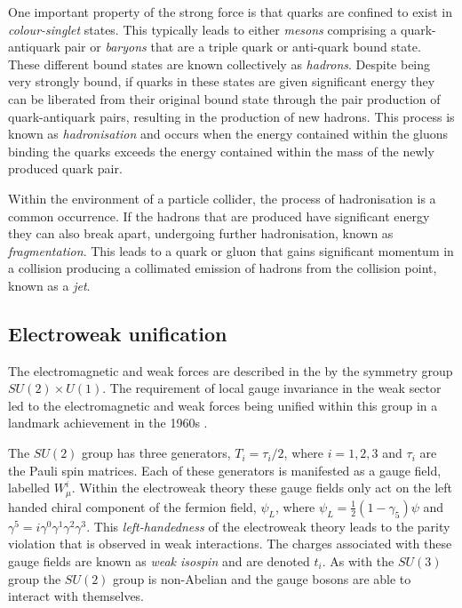 One important property of the strong force is that quarks are
confined to exist in \emph{colour-singlet} states. This typically leads to either
\emph{mesons} comprising a quark-antiquark pair or \emph{baryons} that are a
triple quark or anti-quark bound state. These different bound states are known
collectively as \emph{hadrons}. Despite being very strongly bound, if
quarks in these states are given significant energy they can be
liberated from their original bound state through the pair production
of quark-antiquark pairs, resulting in the production of new hadrons. This
process is known as \emph{hadronisation} and occurs when the energy
contained within the gluons binding the quarks exceeds the energy
contained within the mass of the newly produced quark pair. 

Within
the environment of a particle collider, the process of hadronisation
is a common occurrence. 
If the hadrons that are produced have
significant energy they can also break apart, undergoing further
hadronisation, known as \emph{fragmentation}. This
leads to a quark or gluon that gains significant momentum in a
collision producing a collimated emission of hadrons from
the collision point, known as a \emph{jet}.

\subsection{Electroweak unification}

The electromagnetic and weak forces are described in the \SM by the
symmetry group $SU(2)\times U(1)$. The requirement of local gauge
invariance in the weak sector led to the electromagnetic and weak
forces being unified within this group in a landmark achievement in
the 1960s \cite{Glashow:1961tr,PhysRevLett.19.1264,Salam:1964ry}.

The $SU(2)$ group has three generators, $T_i=\tau_i/2$, where
$i=1,2,3$ and $\tau_i$ are the Pauli spin matrices. Each of these generators is manifested
as a gauge field, labelled $W_{\mu}^i$. Within the electroweak theory
these gauge fields only act on the left handed chiral component of the
fermion field, $\psi_L$, where $\psi_L = \frac{1}{2}(1-\gamma_5)\psi$ and
$\gamma^5=i\gamma^0\gamma^1\gamma^2\gamma^3$. This 
\emph{left-handedness} of the electroweak theory leads to the parity violation
that is observed in weak interactions. The charges associated with
these gauge fields are known as \emph{weak isospin} and are denoted
$t_i$. As with the $SU(3)$ group the $SU(2)$ group is non-Abelian and
the gauge bosons are able to interact with themselves.

